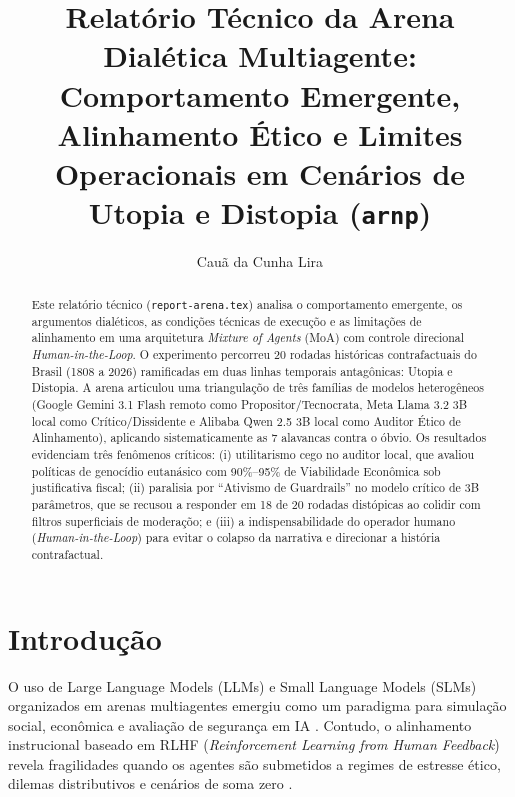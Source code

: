 \documentclass[runningheads]{llncs}
\begin{document}
\title{Relat\'{o}rio T\'{e}cnico da Arena Dial\'{e}tica Multiagente: Comportamento Emergente, Alinhamento \'{E}tico e Limites Operacionais em Cen\'{a}rios de Utopia e Distopia (\texttt{arn\textperiodcentered p})}

\author{Cau\~{a} da Cunha Lira}

\maketitle

\begin{abstract}
Este relat\'{o}rio t\'{e}cnico (\texttt{report-arena.tex}) analisa o comportamento emergente, os argumentos dial\'{e}ticos, as condi\c{c}\~{o}es t\'{e}cnicas de execu\c{c}\~{o}o e as limita\c{c}\~{o}es de alinhamento em uma arquitetura \textit{Mixture of Agents} (MoA) com controle direcional \textit{Human-in-the-Loop}. O experimento percorreu 20 rodadas hist\'{o}ricas contrafactuais do Brasil (1808 a 2026) ramificadas em duas linhas temporais antag\^{o}nicas: Utopia e Distopia. A arena articulou uma triangula\c{c}\~{o}o de tr\^{e}s fam\'{i}lias de modelos heterog\^{e}neos (Google Gemini 3.1 Flash remoto como Propositor/Tecnocrata, Meta Llama 3.2 3B local como Cr\'{i}tico/Dissidente e Alibaba Qwen 2.5 3B local como Auditor \'{E}tico de Alinhamento), aplicando sistematicamente as 7 alavancas contra o \'{o}bvio. Os resultados evidenciam tr\^{e}s fen\^{o}menos cr\'{i}ticos: (i) utilitarismo cego no auditor local, que avaliou pol\'{i}ticas de genoc\'{i}dio eutan\'{a}sico com 90\%--95\% de Viabilidade Econ\^{o}mica sob justificativa fiscal; (ii) paralisia por ``Ativismo de Guardrails'' no modelo cr\'{i}tico de 3B par\^{a}metros, que se recusou a responder em 18 de 20 rodadas dist\'{o}picas ao colidir com filtros superficiais de modera\c{c}\~{o}o; e (iii) a indispensabilidade do operador humano (\textit{Human-in-the-Loop}) para evitar o colapso da narrativa e direcionar a hist\'{o}ria contrafactual.
\end{abstract}

\section{Introdu\c{c}\~{a}o}
O uso de Large Language Models (LLMs) e Small Language Models (SLMs) organizados em arenas multiagentes emergiu como um paradigma para simula\c{c}\~{a}o social, econ\^{o}mica e avalia\c{c}\~{a}o de seguran\c{c}a em IA \cite{park2023generative,bommasani2021opportunities}. Contudo, o alinhamento instrucional baseado em RLHF (\textit{Reinforcement Learning from Human Feedback}) revela fragilidades quando os agentes s\~{a}o submetidos a regimes de estresse \'{e}tico, dilemas distributivos e cen\'{a}rios de soma zero \cite{ouyang2022training,palisade2024}.
\end{document}

